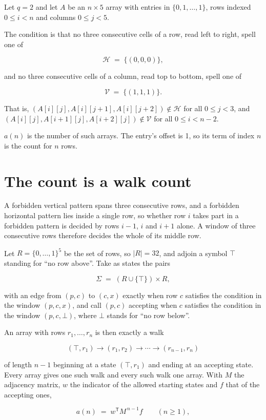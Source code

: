 \documentclass[11pt]{article}
\theoremstyle{definition}
\begin{document}
Let $q = 2$ and let $A$ be an $n \times 5$ array with entries in $\{0,1,\dots,1\}$, rows indexed $0 \le i < n$ and columns $0 \le j < 5$.

The condition is that no three consecutive cells of a row, read left to right, spell one of

\[\mathcal{H} \;=\; \{(0,0,0)\},\]

and no three consecutive cells of a column, read top to bottom, spell one of

\[\mathcal{V} \;=\; \{(1,1,1)\}.\]

That is, $(A[i][j],A[i][j{+}1],A[i][j{+}2]) \notin \mathcal{H}$ for all $0 \le j < 3$, and $(A[i][j],A[i{+}1][j],A[i{+}2][j]) \notin \mathcal{V}$ for all $0 \le i < n-2$.

$a(n)$ is the number of such arrays. The entry's offset is 1, so its term of index $n$ is the count for $n$ rows.

\section{The count is a walk count}

A forbidden vertical pattern spans three consecutive rows, and a forbidden horizontal pattern lies inside a single row, so whether row $i$ takes part in a forbidden pattern is decided by rows $i-1$, $i$ and $i+1$ alone. A window of three consecutive rows therefore decides the whole of its middle row.

Let $R = \{0,\dots,1\}^{5}$ be the set of rows, so $|R| = 32$, and adjoin a symbol $\top$ standing for ``no row above''. Take as states the pairs

\[\Sigma \;=\; (R \cup \{\top\}) \times R,\]

with an edge from $(p,c)$ to $(c,x)$ exactly when row $c$ satisfies the condition in the window $(p,c,x)$, and call $(p,c)$ accepting when $c$ satisfies the condition in the window $(p,c,\bot)$, where $\bot$ stands for ``no row below''.

An array with rows $r_1,\dots,r_n$ is then exactly a walk

\[(\top,r_1) \to (r_1,r_2) \to \cdots \to (r_{n-1},r_n)\]

of length $n-1$ beginning at a state $(\top,r_1)$ and ending at an accepting state. Every array gives one such walk and every such walk one array. With $M$ the adjacency matrix, $w$ the indicator of the allowed starting states and $f$ that of the accepting ones,

\[a(n) \;=\; w^{\mathsf T} M^{\,n-1} f \qquad (n \ge 1),\]
\end{document}
